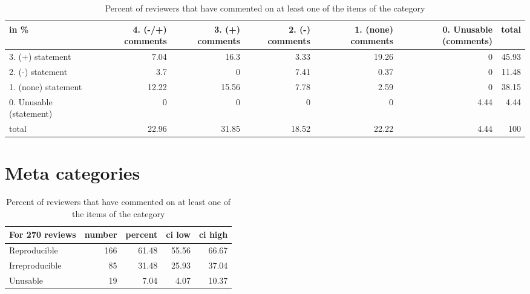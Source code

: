 \documentclass{article}
\begin{document}
\begin{table}[H]

\centering

\begin{tabular}{lrrrrrr}
\hline
 in \%                    &   4. (-/+) comments &   3. (+) comments &   2. (-) comments &   1. (none) comments &   0. Unusable (comments) &   total \\
\hline
 3. (+) statement        &                7.04 &             16.3  &              3.33 &                19.26 &                     0    &   45.93 \\
 2. (-) statement        &                3.7  &              0    &              7.41 &                 0.37 &                     0    &   11.48 \\
 1. (none) statement     &               12.22 &             15.56 &              7.78 &                 2.59 &                     0    &   38.15 \\
 0. Unusable (statement) &                0    &              0    &              0    &                 0    &                     4.44 &    4.44 \\
 total                   &               22.96 &             31.85 &             18.52 &                22.22 &                     4.44 &  100    \\
\hline
\end{tabular}\caption{Percent of reviewers that have commented on at least one of the items of the category}

\end{table}



\section{Meta categories} 

\begin{table}[H]

\centering

\begin{tabular}{lrrrr}
\hline
 For 270 reviews   &   number &   percent &   ci low &   ci high \\
\hline
 Reproducible      &      166 &     61.48 &    55.56 &     66.67 \\
 Irreproducible    &       85 &     31.48 &    25.93 &     37.04 \\
 Unusable          &       19 &      7.04 &     4.07 &     10.37 \\
\hline
\end{tabular}\caption{Percent of reviewers that have commented on at least one of the items of the category}

\end{table}
\end{document}
